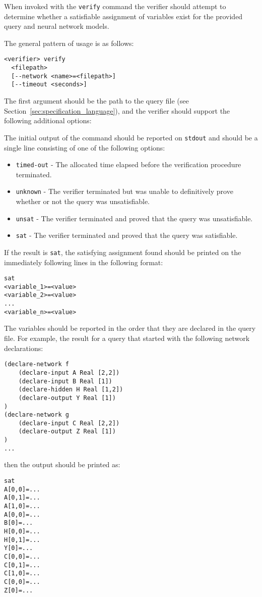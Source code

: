 When invoked with the \texttt{verify} command  the verifier should attempt to determine whether a satisfiable assignment of variables exist for the provided \vnnlib{} query and neural network models.

The general pattern of usage is as follows:
\begin{lstlisting}[style=bash]
<verifier> verify 
  <filepath>
  [--network <name>=<filepath>]
  [--timeout <seconds>]
\end{lstlisting}
The first argument should be the path to the \vnnlib{} query file (see Section~\ref{sec:specification_language}), and the verifier should support the following additional options:



\noindent The initial output of the command should be reported on \texttt{stdout} and should be a single line consisting of one of the following options: 
\begin{itemize}
\item \texttt{timed-out} - The allocated time elapsed before the verification procedure terminated.
\item \texttt{unknown} - The verifier terminated but was unable to definitively prove whether or not the query was unsatisfiable.
\item \texttt{unsat} - The verifier terminated and proved that the query was unsatisfiable.
\item \texttt{sat} - The verifier terminated and proved that the query was satisfiable.
\end{itemize}
If the result is \texttt{sat}, the satisfying assignment found should be printed on the immediately following lines in the following format:
\begin{lstlisting}[style=bash]
sat
<variable_1>=<value>
<variable_2>=<value>
...
<variable_n>=<value>
\end{lstlisting}
The variables should be reported in the order that they are declared in the query file. For example, the result for a \vnnlib{} query that started with the following network declarations:
\begin{lstlisting}[style=bash]
(declare-network f
    (declare-input A Real [2,2])
    (declare-input B Real [1])
    (declare-hidden H Real [1,2])
    (declare-output Y Real [1])
)
(declare-network g
    (declare-input C Real [2,2])
    (declare-output Z Real [1])
)
...
\end{lstlisting}
then the output should be printed as:
\begin{lstlisting}[style=bash]
sat
A[0,0]=...
A[0,1]=...
A[1,0]=...
A[0,0]=...
B[0]=...
H[0,0]=...
H[0,1]=...
Y[0]=...
C[0,0]=...
C[0,1]=...
C[1,0]=...
C[0,0]=...
Z[0]=...
\end{lstlisting}



